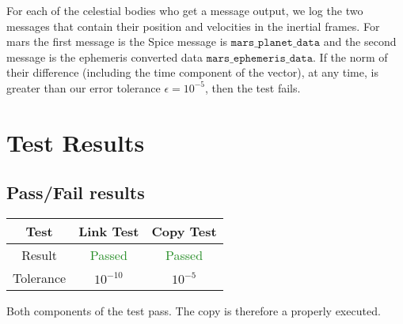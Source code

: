 \documentclass[]{BasiliskReportMemo}
\begin{document}
For each of the celestial bodies who get a message output, we log the two messages that contain their position and velocities in the inertial frames. For mars the first message is the Spice message is $\texttt{mars$\_$planet$\_$data}$
and the second message is the ephemeris converted data $\texttt{mars$\_$ephemeris$\_$data}$. If the norm of their difference (including the time component of the vector), at any time, is greater than our error tolerance $\epsilon =10^{-5}$, then the test fails.


\section{Test Results}

\subsection{Pass/Fail results}

\begin{center}
\begin{tabular}{c|c|c}
Test & Link Test & Copy Test \\ \hline
Result &  \textcolor{ForestGreen}{Passed} &  \textcolor{ForestGreen}{Passed} \\ \hline
Tolerance & $10^{-10}$ & $10^{-5}$
\end{tabular}
\end{center}

Both components of the test pass. The copy is therefore a properly executed.
\end{document}
